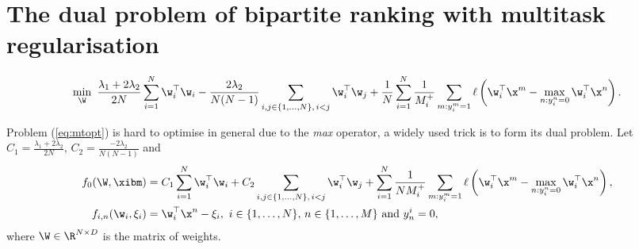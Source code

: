 \section{The dual problem of bipartite ranking with multitask regularisation}

\begin{equation}
\label{eq:mtopt}
\begin{aligned}
\min_{\W} \ \frac{\lambda_1 + 2\lambda_2}{2 N} \sum_{i=1}^{N} \w_i^\top \w_i 
- \frac{2\lambda_2}{N (N - 1)} \sum_{i, j \in \{1,\dots,N\}, \, i < j} \w_i^\top \w_j
+ \frac{1}{N} \sum_{i = 1}^{N} \frac{1}{M_i^+} \sum_{m: y_i^m = 1} \ell \left( \w_i^\top \x^m - \max_{n: y_i^n = 0} \w_i^\top \x^n \right).
\end{aligned}
\end{equation}

Problem (\ref{eq:mtopt}) is hard to optimise in general due to the \emph{max} operator,
a widely used trick is to form its dual problem.
Let $C_1 = \frac{\lambda_1 + 2\lambda_2}{2 N}$, $C_2 = \frac{-2\lambda_2}{N (N - 1)}$ and
\begin{equation*}
\begin{aligned}
f_0(\W, \xibm) &=  C_1 \sum_{i=1}^{N} \w_i^\top \w_i + C_2 \sum_{i, j \in \{1,\dots,N\}, \, i < j} \w_i^\top \w_j
    + \sum_{i = 1}^{N} \frac{1}{N M_i^+} \sum_{m: y_i^m = 1} \ell \left( \w_i^\top \x^m - \max_{n: y_i^n = 0} \w_i^\top \x^n \right), \\
f_{i,n}(\w_i, \xi_i) &= \w_i^\top \x^n - \xi_i, \ i \in \{1,\dots,N\}, \, n \in \{1,\dots,M\} \ \mathrm{and} \ y_n^i = 0,
\end{aligned}
\end{equation*}
where $\W \in \R^{N \times D}$ is the matrix of weights.

